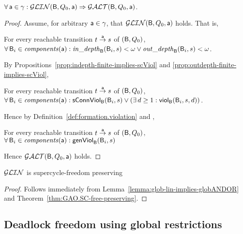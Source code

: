 \begin{lemma} \label{lemma:glob-lin-implies-globANDOR} \label{GLinGAO}
$\fa \act \in \gamma: \GLin(\B, Q_0, \act) \imp \GAO(\B, Q_0, \act)$.  
\end{lemma}
%
\begin{proof}
Assume, for arbitrary $\act \in \gamma$, that $\GLin(\B, Q_0, \act)$ holds. That is, 
 
\ind For every reachable transition $t \goesto[\act] s$ of $(\B, Q_0)$,\\
\ind \ind  $\fas \B_i \in \cmps{\act}: \widepth{\B}{\B_i}{s} < \omega \lor \wodepth{\B}{\B_i}{s} < \omega$.

\noindent
By Propositions~\ref{prop:indepth-finite-implies-scViol} and \ref{prop:outdepth-finite-implies-scViol}, 

\ind For every reachable transition $t \goesto[\act] s$ of $(\B, Q_0)$,\\
\ind \ind  $\fas \B_i \in \cmps{\act}:  \connViol{\B_i}{s} \lor (\ex d \ge 1: \viol{\B_i}{d}{s})$.

\noindent
Hence by Definition~\ref{def:formation.violation}
and , 

\ind For every reachable transition $t \goesto[\act] s$ of $(\B, Q_0)$,\\
\ind \ind  $\fas \B_i \in \cmps{\act} : \formViol{\B_i}{s}$

\noindent
Hence $\GAO(\B, Q_0, \act)$ holds.
\end{proof}


\begin{theorem} \label{thm:GLin.SC-free-preserving}
$\GLin$ is supercycle-freedom preserving
\end{theorem}
%
\begin{proof}
Follows immediately from Lemma~\ref{lemma:glob-lin-implies-globANDOR} and Theorem~\ref{thm:GAO.SC-free-preserving}.
\end{proof}





\subsection{Deadlock freedom using global restrictions}


